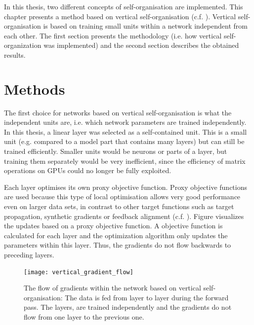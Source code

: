 In this thesis, two different concepts of self-organisation are implemented.
This chapter presents a method based on vertical self-organisation (c.f. ).
Vertical self-organisation is based on training small units within a network independent from each other.
The first section presents the methodology (i.e. how vertical self-organization was implemented) and the second section describes the obtained results.


\section{Methods}
The first choice for networks based on vertical self-organisation is what the independent units are, i.e. which network parameters are trained independently.
In this thesis, a linear layer was selected as a self-contained unit. This is a small unit (e.g. compared to a model part that contains many layers) but can still be trained efficiently.
Smaller units would be neurons or parts of a layer, but training them separately would be very inefficient, since the efficiency of matrix operations on GPUs could no longer be fully exploited.

Each layer optimises its own proxy objective function.
Proxy objective functions are used because this type of local optimisation allows very good performance even on larger data sets, in contrast to other target functions such as target propagation, synthetic gradients or feedback alignment (c.f. ). 
Figure  visualizes the updates based on a proxy objective function.
A objective function is calculated for each layer and the optimization algorithm only updates the parameters within this layer.
Thus, the gradients do not flow backwards to preceding layers.

\begin{figure}[h]
    \centering
    \texttt{[image: vertical\_gradient\_flow]}
    \caption[The flow of gradients within the network based on vertical self-organisation]{The flow of gradients within the network based on vertical self-organisation: The data is fed from layer to layer during the forward pass. The layers, are trained independently and the gradients do not flow from one layer to the previous one.}
\end{figure}

